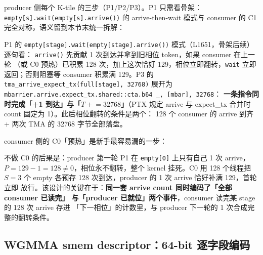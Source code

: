producer 侧每个 K-tile 的三步（P1/P2/P3）。P1 只需看骨架：
\texttt{empty[s].\allowbreak{}wait\allowbreak{}(empty[s].\allowbreak{}arrive\allowbreak{}())} 的 arrive-then-wait 模式与
consumer 的 C1 完全对称，语义留到本节末统一拆解：





P1 的 \texttt{empty[stage].\allowbreak{}wait\allowbreak{}(empty[stage].\allowbreak{}arrive\allowbreak{}())} 模式（L1651，骨架后续）
逐句看：
\texttt{arrive()} 先贡献 1 次到达并拿到旧相位 token，如果 consumer 在上一轮
（或 C0 预热）已积累 128 次，加上这次恰好 129，相位立即翻转，\texttt{wait} 立即
返回；否则阻塞等 consumer 积累满 129。P3 的
\texttt{tma\_\allowbreak{}arrive\_\allowbreak{}expect\_\allowbreak{}tx\allowbreak{}(full[stage],\allowbreak{} 32768)} 展开为
\texttt{mbarrier.\allowbreak{}arrive.\allowbreak{}expect\_\allowbreak{}tx.\allowbreak{}shared::\allowbreak{}cta.\allowbreak{}b64 \_\allowbreak{},\allowbreak{} [mbar],\allowbreak{} 32768}：
\textbf{一条指令同时完成「+1 到达」与「$T \mathrel{+}= 32768$」}（PTX 规定
arrive 与 expect\_tx 合并时 count 固定为 1）。此后相位翻转的条件是两个：
128 个 consumer 的 arrive 到齐 + 两次 TMA 的 32768 字节全部落盘。

consumer 侧的 C0「预热」是新手最容易漏的一步：



不做 C0 的后果是：producer 第一轮 P1 在 \texttt{empty[0]} 上只有自己 1 次 arrive，
$P = 129 - 1 = 128 \ne 0$，相位永不翻转，整个 kernel 挂死。C0 用 128 个线程把
$S = 3$ 个 empty 各预存 128 次到达，producer 的 1 次 arrive 恰好补满 129，首轮立即
放行。该设计的关键在于：\textbf{同一套 arrive count 同时编码了「全部 consumer 已读完」
与「producer 已就位」两个事件}，consumer 读完某 stage 的 128 次 arrive 存进
「下一相位」的计数里，与 producer 下一轮的 1 次合成完整的翻转条件。

\subsection{WGMMA smem descriptor：64-bit 逐字段编码}

